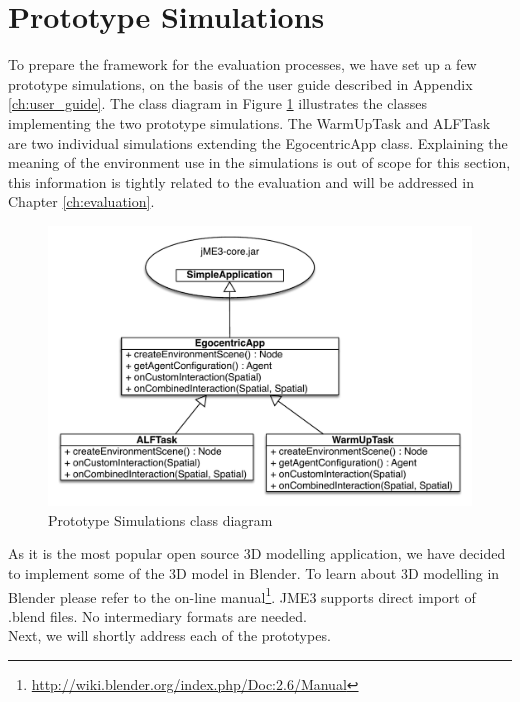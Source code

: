 \section{Prototype Simulations} %
\label{sec:impl_prototype_simulations}
To prepare the framework for the evaluation processes, we have set up a few prototype simulations, on the basis of the user guide described in Appendix \ref{ch:user_guide}. The class diagram in Figure \ref{fig:impl_prototype_simulations} illustrates the classes implementing the two prototype simulations. The WarmUpTask and ALFTask are two individual simulations extending the EgocentricApp class. Explaining the meaning of the environment use in the simulations is out of scope for this section, this information is tightly related to the evaluation and will be addressed in Chapter \ref{ch:evaluation}.
\begin{figure}[H]
	\centering
	\includegraphics[width=\linewidth]{gfx/Chapter4/prototype_simulations}
	\caption{Prototype Simulations class diagram}
	\label{fig:impl_prototype_simulations}
\end{figure}

As it is the most popular open source 3D modelling application, we have decided to implement some of the 3D model in Blender. To learn about 3D modelling in Blender please refer to the on-line manual\footnote{\url{http://wiki.blender.org/index.php/Doc:2.6/Manual}}. JME3 supports direct import of .blend files. No intermediary formats are needed.\\

Next, we will shortly address each of the prototypes.
